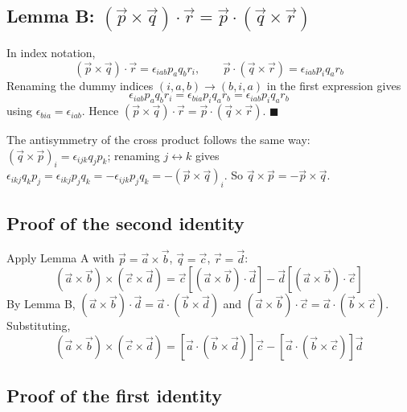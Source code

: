 \documentclass[12pt]{article}
\begin{document}
\subsection*{Lemma B: $(\vec p \times \vec q)\cdot\vec r = \vec p \cdot (\vec q \times \vec r)$}

In index notation,
\begin{equation*}
    (\vec p \times \vec q)\cdot\vec r = \epsilon_{iab}p_aq_b r_i, \qquad \vec p \cdot (\vec q \times \vec r) = \epsilon_{iab}p_iq_ar_b
\end{equation*}
Renaming the dummy indices $(i,a,b)\to(b,i,a)$ in the first expression gives
\begin{equation*}
    \epsilon_{iab}p_aq_br_i = \epsilon_{bia}p_iq_ar_b = \epsilon_{iab}p_iq_ar_b
\end{equation*}
using $\epsilon_{bia}=\epsilon_{iab}$. Hence $(\vec p \times \vec q)\cdot \vec r = \vec p \cdot (\vec q \times \vec r)$. \hfill $\blacksquare$

The antisymmetry of the cross product follows the same way: $(\vec q\times\vec p)_i = \epsilon_{ijk}q_jp_k$; renaming $j\leftrightarrow k$ gives $\epsilon_{ikj}q_kp_j = \epsilon_{ikj}p_jq_k = -\epsilon_{ijk}p_jq_k = -(\vec p\times\vec q)_i$. So $\vec q\times\vec p = -\vec p\times\vec q$.

\subsection*{Proof of the second identity}

Apply Lemma A with $\vec p = \vec a\times\vec b$, $\vec q = \vec c$, $\vec r = \vec d$:
\begin{equation*}
    (\vec a\times\vec b)\times(\vec c\times\vec d) = \vec c\left[(\vec a\times\vec b)\cdot\vec d\right] - \vec d\left[(\vec a\times\vec b)\cdot\vec c\right]
\end{equation*}
By Lemma B, $(\vec a\times\vec b)\cdot\vec d = \vec a\cdot(\vec b\times\vec d)$ and $(\vec a\times\vec b)\cdot\vec c = \vec a\cdot(\vec b\times\vec c)$. Substituting,
\begin{equation}
    \boxed{(\vec a\times\vec b)\times(\vec c\times\vec d) = \left[\vec a\cdot(\vec b\times\vec d)\right]\vec c - \left[\vec a\cdot(\vec b\times\vec c)\right]\vec d}
\end{equation}

\subsection*{Proof of the first identity}
\end{document}
